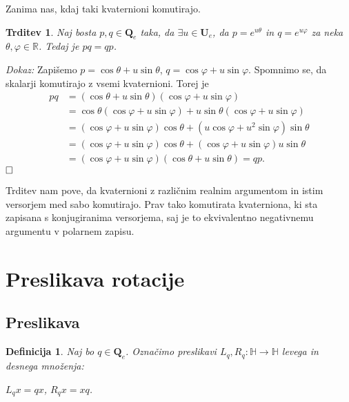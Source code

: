 \documentclass[a4paper,12pt]{article}
\def\R{\mathbb{R}} %
\def\H{\mathbb{H}} %
\def\Qe{\textbf{Q}_{e}} %
\def\Ue{\textbf{U}_{e}} %
\def\qed{$\hfill\Box$}   %
\newtheorem{trditev}{Trditev}
\newtheorem{definicija}{Definicija}
\begin{document}
Zanima nas, kdaj taki kvaternioni komutirajo.
\begin{trditev}
Naj bosta $p,q \in \Qe$ taka, da $\exists u \in \Ue$, da $p = e^{u\theta}$ in $q = e^{u\varphi}$ za neka $\theta, \varphi \in \R$.
Tedaj je $pq = qp$.
\end{trditev}
\noindent
{\em Dokaz:\/} Zapišemo $p = \cos\theta + u\sin\theta$, $q = \cos\varphi + u\sin\varphi$.
Spomnimo se, da skalarji komutirajo z vsemi kvaternioni. Torej je
\begin{align*}
   pq & = (\cos\theta + u\sin\theta)(\cos\varphi + u\sin\varphi)\\
   & = \cos\theta(\cos\varphi + u\sin\varphi) + u\sin\theta(\cos\varphi + u\sin\varphi)\\
   & = (\cos\varphi + u\sin\varphi)\cos\theta + (u\cos\varphi + u^2\sin\varphi)\sin\theta\\
   & = (\cos\varphi + u\sin\varphi)\cos\theta + (\cos\varphi + u\sin\varphi)u\sin\theta\\
   & = (\cos\varphi + u\sin\varphi)(\cos\theta + u\sin\theta) = qp.
\end{align*}
\qed

Trditev nam pove, da kvaternioni z različnim realnim argumentom in istim versorjem med sabo komutirajo.
Prav tako komutirata kvaterniona, ki sta zapisana s konjugiranima versorjema, saj je to ekvivalentno negativnemu argumentu v polarnem zapisu.

\section{Preslikava rotacije}
\subsection{Preslikava}
\begin{definicija}
Naj bo $q \in \Qe$. Označimo preslikavi $L_{q}, R_{q} : \H \to \H$ levega in desnega množenja:
\begin{center}
   $L_{q}x = qx$, $R_{q}x = xq$.
\end{center}
\end{definicija}
\end{document}
